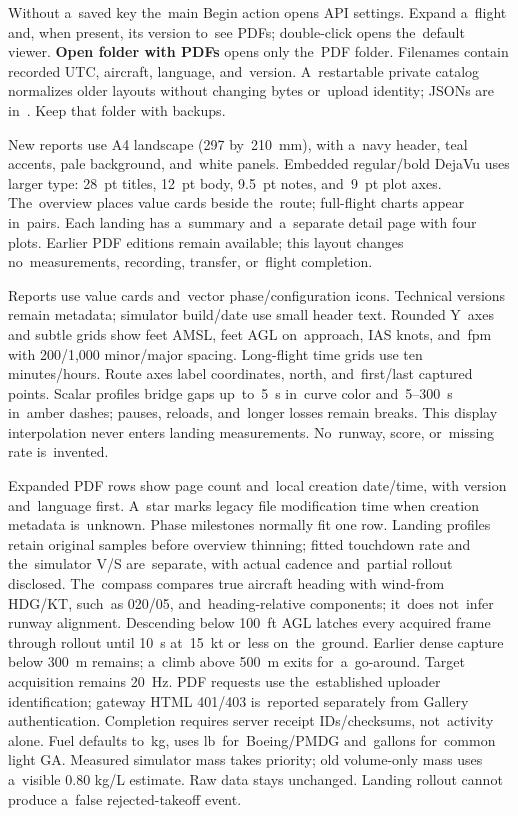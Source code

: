 \documentclass[11pt,a4paper]{article}
\newcommand{\filepath}[1]{\path{#1}}
\newcommand{\ui}[1]{\textbf{#1}}
\begin{document}
Without a~saved key the~main Begin action opens API
settings. Expand a~flight and, when present, its version to~see PDFs;
double-click opens the~default
viewer. \ui{Open folder with PDFs} opens only the~PDF folder. Filenames contain
recorded UTC, aircraft, language, and~version. A~restartable private catalog
normalizes older layouts without changing bytes or~upload identity; JSONs are
in~\filepath{reports/.metadata/}. Keep that folder with backups.

New reports use A4 landscape (297 by~210~mm), with a~navy header,
teal accents, pale background, and~white panels. Embedded regular/bold DejaVu
uses larger type: 28~pt titles, 12~pt body, 9.5~pt notes, and~9~pt plot axes.
The~overview places value cards beside the~route; full-flight charts appear
in~pairs. Each landing has a~summary and~a~separate detail page with four plots.
Earlier PDF editions remain available; this layout changes no~measurements,
recording, transfer, or~flight completion.

Reports use value cards and~vector phase/configuration icons. Technical versions
remain metadata; simulator build/date use small header text. Rounded Y~axes and
subtle grids show feet AMSL, feet AGL on~approach, IAS knots, and~fpm with
200/1,000 minor/major spacing. Long-flight time grids use ten minutes/hours.
Route axes label coordinates, north, and~first/last captured points. Scalar
profiles bridge gaps up~to~5~s in~curve color and~5--300~s in~amber dashes;
pauses, reloads, and~longer losses remain breaks. This display interpolation
never enters landing measurements. No~runway, score, or~missing rate
is~invented.

Expanded PDF rows show page count and~local creation date/time, with version
and~language first. A~star marks legacy file modification time when creation
metadata is~unknown. Phase milestones normally fit one row. Landing profiles
retain original samples before overview thinning; fitted touchdown rate and
the~simulator V/S are~separate, with actual cadence and~partial rollout
disclosed.
The~compass compares true aircraft heading with wind-from HDG/KT, such~as
020/05, and~heading-relative components; it~does not~infer runway alignment.
Descending below 100~ft AGL latches every acquired frame through rollout until
10~s at~15~kt or~less on~the~ground. Earlier dense capture below 300~m remains;
a~climb above 500~m exits for~a~go-around. Target acquisition remains 20~Hz.
PDF requests use the~established uploader identification; gateway HTML 401/403
is~reported separately from Gallery authentication. Completion requires
server receipt IDs/checksums, not~activity alone. Fuel defaults to~kg,
uses lb~for~Boeing/PMDG and~gallons for~common light GA. Measured simulator mass
takes priority; old volume-only mass uses a~visible 0.80 kg/L estimate. Raw data
stays unchanged. Landing rollout cannot produce a~false rejected-takeoff event.
\end{document}

